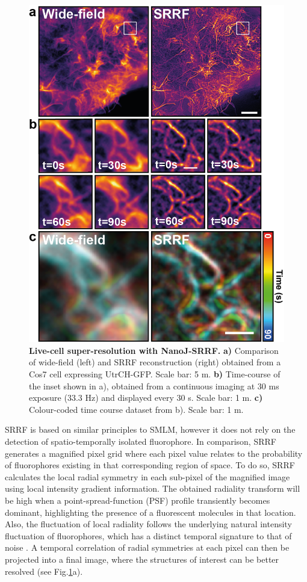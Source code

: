 \begin{figure}[!t]
    \centering
    \includegraphics{Figures/FigureSRRF_v4.png}
    \caption{\textbf{Live-cell super-resolution with NanoJ-SRRF.} \textbf{a)} Comparison of wide-field (left) and SRRF reconstruction (right) obtained from a Cos7 cell expressing UtrCH-GFP. Scale bar: 5 \micro m. \textbf{b)} Time-course of the inset shown in a), obtained from  a continuous imaging at 30 ms exposure (33.3 Hz) and displayed every 30 s. Scale bar: 1 \micro m. \textbf{c)} Colour-coded time course dataset from b). Scale bar: 1 \micro m.}
    \label{fig:SRRF}
\end{figure}
 
 SRRF is based on similar principles to SMLM, however it does not rely on the detection of spatio-temporally isolated fluorophore. In comparison, SRRF generates a magnified pixel grid where each pixel value relates to the probability of fluorophores existing in that corresponding region of space. To do so, SRRF calculates the local radial symmetry in each sub-pixel of the magnified image using local intensity gradient information. The obtained radiality transform will be high when a point-spread-function (PSF) profile transiently becomes dominant, highlighting the presence of a fluorescent molecules in that location. Also, the fluctuation of local radiality follows the underlying natural intensity fluctuation of fluorophores, which has a distinct temporal signature to that of noise \cite{dertinger2009fast}. A temporal correlation of radial symmetries at each pixel can then be projected into a final image, where the structures of interest can be better resolved (see Fig.\ref{fig:SRRF}a).
 
